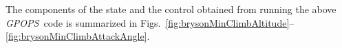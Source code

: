 \documentclass[10pt]{article}
\newcommand{\gpops}{{\em GPOPS}~}
\begin{document}
\normalsize
The components of the state and the control obtained from running the
above \gpops code is summarized in 
Figs.~\ref{fig:brysonMinClimbAltitude}--\ref{fig:brysonMinClimbAttackAngle}.  
\begin{figure}[h]
\centering
{}~~~~~


\end{figure}
\end{document}
